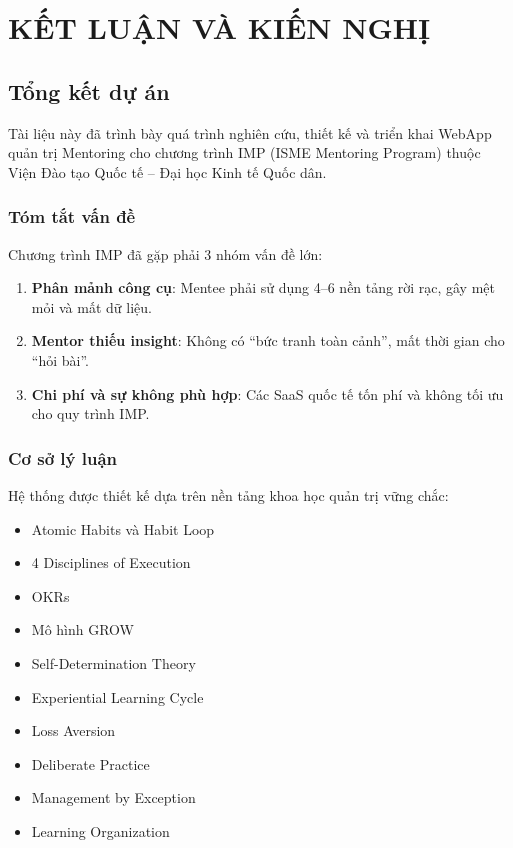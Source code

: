 \chapter{KẾT LUẬN VÀ KIẾN NGHỊ}

\section{Tổng kết dự án}
Tài liệu này đã trình bày quá trình nghiên cứu, thiết kế và triển khai WebApp quản trị Mentoring cho chương trình IMP (ISME Mentoring Program) thuộc Viện Đào tạo Quốc tế -- Đại học Kinh tế Quốc dân.

\subsection{Tóm tắt vấn đề}
Chương trình IMP đã gặp phải 3 nhóm vấn đề lớn:
\begin{enumerate}
  \item \textbf{Phân mảnh công cụ}: Mentee phải sử dụng 4--6 nền tảng rời rạc, gây mệt mỏi và mất dữ liệu.
  \item \textbf{Mentor thiếu insight}: Không có ``bức tranh toàn cảnh'', mất thời gian cho ``hỏi bài''.
  \item \textbf{Chi phí và sự không phù hợp}: Các SaaS quốc tế tốn phí và không tối ưu cho quy trình IMP.
\end{enumerate}

\subsection{Cơ sở lý luận}
Hệ thống được thiết kế dựa trên nền tảng khoa học quản trị vững chắc:
\begin{itemize}
  \item Atomic Habits và Habit Loop \citep{atomichabits2018, duhigg2012}
  \item 4 Disciplines of Execution \citep{4dx2012}
  \item OKRs \citep{okrs2018}
  \item Mô hình GROW \citep{grow2009}
  \item Self-Determination Theory \citep{ryan2000}
  \item Experiential Learning Cycle \citep{kolb1984}
  \item Loss Aversion \citep{kahneman1979}
  \item Deliberate Practice \citep{ericsson2016}
  \item Management by Exception \citep{mbe1961}
  \item Learning Organization \citep{senge2006}
\end{itemize}

